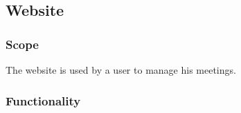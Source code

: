 \begin{comment}
Template vir elke funksie
    \paragraph{Funksie naam}
			\begin{description}
			    \item{\textbf{Priority}:} %
			    \item{\textbf{Service Contract}:}%
			    \item{\textbf{Pre-conditions}:}%
    			    \begin{itemize}
    			        \item %
    			        \item %
    			    \end{itemize}
			    \item{\textbf{Post-conditions}:} %
    			    \begin{itemize}
    			    \item %
    			    \item %
    			    \end{itemize}
			\end{description}
\end{comment}






\subsection{Website}


	\subsubsection{Scope}
	The website is used by a user to manage his meetings. 
	
	\subsubsection{Functionality}
	
